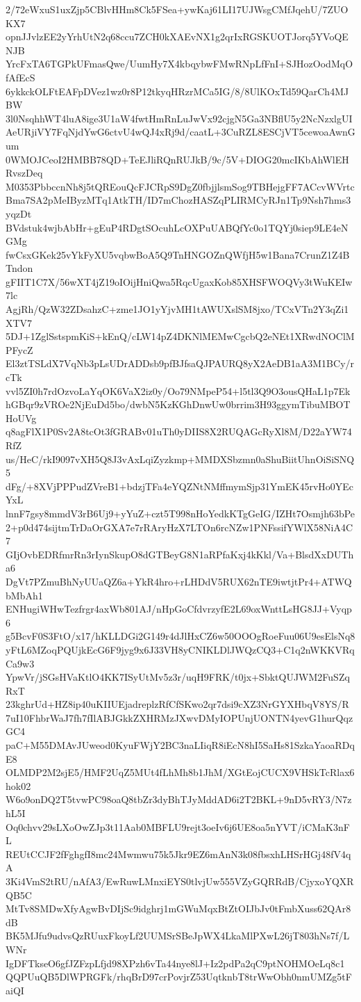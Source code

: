 2/72eWxuS1uxZjp5CBlvHHm8Ck5FSea+ywKaj61LI17UJWsgCMfJqehU/7ZUOKX7
opnJJvlzEE2yYrhUtN2q68ccu7ZCH0kXAEvNX1g2qrIxRGSKUOTJorq5YVoQENJB
YrcFxTA6TGPkUFmasQwe/UumHy7X4kbqybwFMwRNpLfFnI+SJHozOodMqOfAfEcS
6ykkckOLFtEAFpDVez1wz0r8P12tkyqHRzrMCa5IG/8/8UlKOxTd59QarCh4MJBW
3l0NsqhhWT4luA8ige3U1aW4fwtHmRnLuJwVx92cjgN5Ga3NBflU5y2NcNzxlgUI
AeURjiVY7FqNjdYwG6ctvU4wQJ4xRj9d/caatL+3CuRZL8ESCjVT5cewoaAwnGum
0WMOJCeoI2HMBB78QD+TeEJliRQnRUJkB/9c/5V+DIOG20mcIKbAhWlEHRvszDeq
M0353PbbccnNh8j5tQREouQcFJCRpS9DgZ0fbjjlsmSog9TBHejgFF7ACcvWVrtc
Bma7SA2pMeIByzMTq1AtkTH/ID7mChozHASZqPLIRMCyRJn1Tp9Nsh7hms3yqzDt
BVdstuk4wjbAbHr+gEuP4RDgtSOcuhLcOXPuUABQfYc0o1TQYj0siep9LE4eNGMg
fwCsxGKek25vYkFyXU5vqbwBoA5Q9TnHNGOZnQWfjH5w1Bana7CrunZ1Z4BTndon
gFIIT1C7X/56wXT4jZ19oIOijHniQwa5RqcUgaxKob85XHSFWOQVy3tWuKEIw7lc
AgjRh/QzW32ZDsahzC+zme1JO1yYjvMH1tAWUXslSM8jxo/TCxVTn2Y3qZi1XTV7
5DJ+1ZglSstspmKiS+kEnQ/cLW14pZ4DKNlMEMwCgcbQ2eNEt1XRwdNOClMPFycZ
El3ztTSLdX7VqNb3pLsUDrADDsb9pfBJfsaQJPAURQ8yX2AeDB1aA3M1BCy/rcTk
vvl5ZI0h7rdOzvoLaYqOK6VaX2iz0y/Oo79NMpeP54+l5tl3Q9O3ousQHaL1p7Ek
hGBqr9zVROe2NjEuDd5bo/dwbN5KzKGhDnwUw0brrim3H93ggymTibuMBOTHoUVg
q8agFlX1P0Sv2A8tcOt3fGRABv01uTh0yDIIS8X2RUQAGcRyXl8M/D22aYW74RfZ
us/HeC/rkI9097vXH5Q8J3vAxLqiZyzkmp+MMDXSbzmn0aShuBiitUhnOiSiSNQ5
dFg/+8XVjPPPudZVreB1+bdzjTFa4eYQZNtNMffmymSjp31YmEK45rvHo0YEcYxL
lnnF7gsy8mmdV3rB6Uj9+yYuZ+czt5T998nHoYedkKTgGeIG/IZHt7Osmjh63bPe
2+p0d474sijtmTrDaOrGXA7e7rRAryHzX7LTOn6rcNZw1PNFssifYWlX58NiA4C7
GIjOvbEDRfmrRn3rIynSkupO8dGTBeyG8N1aRPfaKxj4kKkl/Va+BlsdXxDUTha6
DgVt7PZmuBhNyUUaQZ6a+YkR4hro+rLHDdV5RUX62nTE9iwtjtPr4+ATWQbMbAh1
ENHugiWHwTezfrgr4axWb801AJ/nHpGoCfdvrzyfE2L69oxWnttLsHG8JJ+Vyqp6
g5BcvF0S3FtO/x17/hKLLDGi2G149r4dJlHxCZ6w50OOOgRoeFuu06U9esElsNq8
yFtL6MZoqPQUjkEcG6F9jyg9x6J33VH8yCNIKLDlJWQzCQ3+C1q2nWKKVRqCa9w3
YpwVr/jSGsHVaKtlO4KK7ISyUtMv5z3r/uqH9FRK/t0jx+SbktQUJWM2FuSZqRxT
23kghrUd+HZ8ip40uKIIUEjadreplzRfCfSKwo2qr7dsi9cXZ3NrGYXHbqV8YS/R
7uI10FhbrWaJ7fh7fIlABJGkkZXHRMzJXwvDMyIOPUnjUONTN4yevG1hurQqzGC4
paC+M55DMAvJUweod0KyuFWjY2BC3naLIiqR8iEcN8hI5SaHs81SzkaYaoaRDqE8
OLMDP2M2sjE5/HMF2UqZ5MUt4fLhMh8b1JhM/XGtEojCUCX9VHSkTcRlax6hok02
W6o9onDQ2T5tvwPC98oaQ8tbZr3dyBhTJyMddAD6i2T2BKL+9nD5vRY3/N7zhL5I
Oq0chvv29sLXoOwZJp3t11Aab0MBFLU9rejt3oeIv6j6UE8oa5nYVT/iCMaK3nFL
REUtCCJF2fFghgfI8mc24Mwmwu75k5Jkr9EZ6mAnN3k08fbsxhLHSrHGj48fV4qA
3Ki4VmS2tRU/nAfA3/EwRuwLMnxiEYS0tlvjUw555VZyGQRRdB/CjyxoYQXRQB5C
MtTv8SMDwXfyAgwBvDIjSc9idghrj1mGWuMqxBtZtOIJbJv0tFmbXuss62QAr8dB
BK5MJfu9udvsQzRUuxFkoyLf2UUMSrSBeJpWX4LkaMlPXwL26jT803hNs7f/LWNr
IgDFTkseO6gfJZFzpLfjd98XPzh6vTa44nye8lJ+Iz2pdPa2qC9ptNOHMOeLq8c1
QQPUuQB5DlWPRGFk/rhqBrD97crPovjrZ53UqtknbT8trWwObh0nmUMZg5tFaiQI
